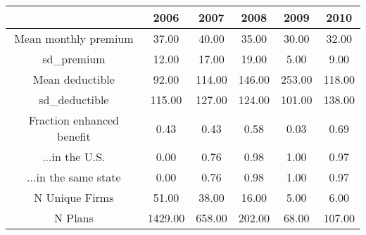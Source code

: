 \begin{table}[ht]
\centering
\begin{tabular}{cccccc}
  \hline
 & 2006 & 2007 & 2008 & 2009 & 2010 \\ 
  \hline
Mean monthly premium & 37.00 & 40.00 & 35.00 & 30.00 & 32.00 \\ 
  sd\_premium & 12.00 & 17.00 & 19.00 & 5.00 & 9.00 \\ 
  Mean deductible & 92.00 & 114.00 & 146.00 & 253.00 & 118.00 \\ 
  sd\_deductible & 115.00 & 127.00 & 124.00 & 101.00 & 138.00 \\ 
  Fraction enhanced benefit & 0.43 & 0.43 & 0.58 & 0.03 & 0.69 \\ 
  ...in the U.S. & 0.00 & 0.76 & 0.98 & 1.00 & 0.97 \\ 
  ...in the same state & 0.00 & 0.76 & 0.98 & 1.00 & 0.97 \\ 
  N Unique Firms & 51.00 & 38.00 & 16.00 & 5.00 & 6.00 \\ 
  N Plans & 1429.00 & 658.00 & 202.00 & 68.00 & 107.00 \\ 
   \hline
\end{tabular}
\end{table}
